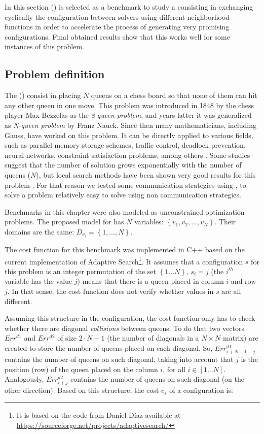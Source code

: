 In this section \nqp{} (\NQP) is selected as a benchmark to study a \commstr{} consisting in exchanging cyclically the configuration between solvers using different neighborhood functions in order to accelerate the process of generating very promising configurations. Final obtained results show that this \commstr{} works well for some instances of this problem.

\subsection{Problem definition}

The \nqp{} (\NQP) consist in placing $N$ queens on a chess board so that none of them can hit any other queen in one move. This problem was introduced in 1848 by the chess player Max Bezzelas as the \textit{8-queen problem}, and years latter it was generalized as \textit{N-queen problem} by Franz Nauck. Since then many mathematicians, including Gauss, have worked on this problem. It can be directly applied to various fields, such as parallel memory storage schemes, traffic control, deadlock prevention, neural networks, constraint satisfaction problems, among others \cite{Bell2009}. Some studies suggest that the number of solution grows exponentially with the number of queens ($N$), but local search methods have been shown very good results for this problem \cite{Sosic1994}. For that reason we tested some communication strategies using \posl{}, to solve a problem relatively easy to solve using non communication strategies.

Benchmarks in this chapter were also modeled as unconstrained optimization problems. The proposed model for \NQP{} has $N$ variables: $\left\{v_1, v_2, \dots, v_N\right\}$. Their domains are the same: $D_{v_i}=\left\{1, \dots, N\right\}$.

The cost function for this benchmark was implemented in C++ based on the current implementation of Adaptive Search\footnote{It is based on the code from Daniel D\'{i}az available at \href{https://sourceforge.net/projects/adaptivesearch/}{https://sourceforge.net/projects/adaptivesearch/}}. It assumes that a configuration $s$ for this problem is an integer permutation of the set $\left\{1...N\right\}$, \ie $s_i = j$ (the $i^{th}$ variable has the value $j$) means that there is a queen placed in column $i$ and row $j$. In that sense, the cost function does not verify whether values in $s$ are all different.

Assuming this structure in the configuration, the cost function only has to check whether there are diagonal \textit{collisions} between queens. To do that two vectors $Err^{d1}$ and $Err^{d2}$ of size $2\cdot N-1$ (the number of diagonals in a $N\times N$ matrix) are created to store the number of queens placed on each diagonal. So, $Err^{d1}_{i+N-1-j}$ contains the number of queens on such diagonal, taking into account that $j$ is the position (row) of the queen placed on the column $i$, for all $i\in [1...N]$. Analogously, $Err^{d2}_{i+j}$ contains the number of queens on such diagonal (on the other direction). Based on this structure, the cost $c_s$ of a configuration is:

